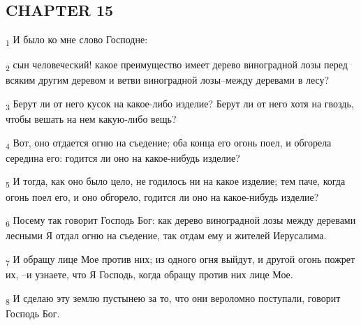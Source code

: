 \subsection{CHAPTER 15}
\begin{tcolorbox}
\textsubscript{1} И было ко мне слово Господне:
\end{tcolorbox}
\begin{tcolorbox}
\textsubscript{2} сын человеческий! какое преимущество имеет дерево виноградной лозы перед всяким другим деревом и ветви виноградной лозы--между деревами в лесу?
\end{tcolorbox}
\begin{tcolorbox}
\textsubscript{3} Берут ли от него кусок на какое-либо изделие? Берут ли от него хотя на гвоздь, чтобы вешать на нем какую-либо вещь?
\end{tcolorbox}
\begin{tcolorbox}
\textsubscript{4} Вот, оно отдается огню на съедение; оба конца его огонь поел, и обгорела середина его: годится ли оно на какое-нибудь изделие?
\end{tcolorbox}
\begin{tcolorbox}
\textsubscript{5} И тогда, как оно было цело, не годилось ни на какое изделие; тем паче, когда огонь поел его, и оно обгорело, годится ли оно на какое-нибудь изделие?
\end{tcolorbox}
\begin{tcolorbox}
\textsubscript{6} Посему так говорит Господь Бог: как дерево виноградной лозы между деревами лесными Я отдал огню на съедение, так отдам ему и жителей Иерусалима.
\end{tcolorbox}
\begin{tcolorbox}
\textsubscript{7} И обращу лице Мое против них; из одного огня выйдут, и другой огонь пожрет их, --и узнаете, что Я Господь, когда обращу против них лице Мое.
\end{tcolorbox}
\begin{tcolorbox}
\textsubscript{8} И сделаю эту землю пустынею за то, что они вероломно поступали, говорит Господь Бог.
\end{tcolorbox}
